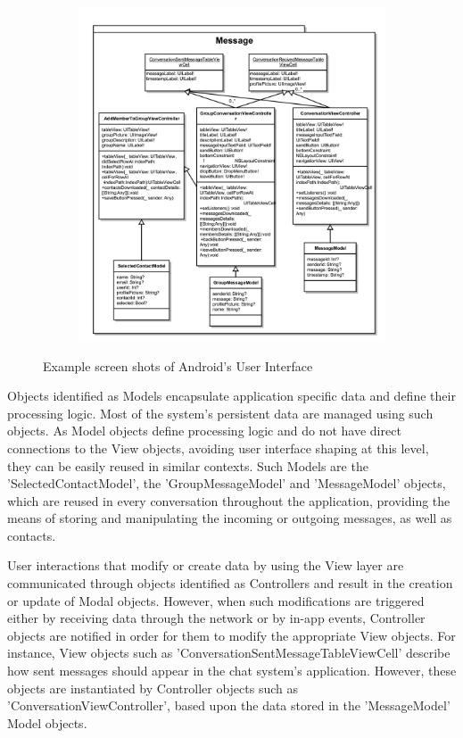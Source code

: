 \documentclass{article}
\begin{document}
	\begin{figure}[H]
		
		\begin{subfigure}{\linewidth}
			\centering
			\includegraphics[width=.8\linewidth]{message.png}\hfill
		\end{subfigure}\par\medskip
		\caption{Example screen shots of Android's User Interface}
		
	\end{figure}
	
	Objects identified as Models encapsulate application specific data and define their processing logic. Most of the system's persistent data are managed using such objects. As Model objects define processing logic and do not have direct connections to the View objects, avoiding user interface shaping at this level, they can be easily reused in similar contexts. Such Models are the 'SelectedContactModel', the 'GroupMessageModel' and 'MessageModel' objects, which are reused in every conversation throughout the application, providing the means of storing and manipulating the incoming or outgoing messages, as well as contacts.\par
	
	User interactions that modify or create data by using the View layer are communicated through objects identified as Controllers and result in the creation or update of Modal objects. However, when such modifications are triggered either by receiving data through the network or by in-app events, Controller objects are notified in order for them to modify the appropriate View objects. For instance, View objects such as 'ConversationSentMessageTableViewCell' describe how sent messages should appear in the chat system's application. However, these objects are instantiated by Controller objects such as 'ConversationViewController', based upon the data stored in the 'MessageModel' Model objects.\par
		
\end{document}
